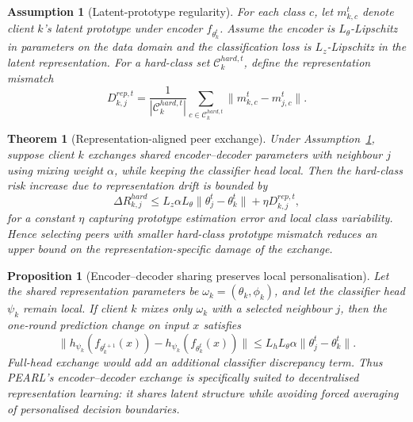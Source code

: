 \documentclass[conference]{IEEEtran}
\newtheorem{assumption}{Assumption}
\newtheorem{proposition}{Proposition}
\newtheorem{theorem}{Theorem}
\begin{document}
\begin{assumption}[Latent-prototype regularity]
\label{ass:latent_prototype_regularity}
For each class \(c\), let \(m_{k,c}^{t}\) denote client \(k\)'s latent prototype under encoder \(f_{\theta_k^t}\). Assume the encoder is \(L_\theta\)-Lipschitz in parameters on the data domain and the classification loss is \(L_z\)-Lipschitz in the latent representation. For a hard-class set \(\mathcal{C}_k^{hard,t}\), define the representation mismatch
\begin{equation*}
D_{k,j}^{rep,t}
=
\frac{1}{|\mathcal{C}_k^{hard,t}|}
\sum_{c\in\mathcal{C}_k^{hard,t}}
\|m_{k,c}^{t}-m_{j,c}^{t}\|.
\end{equation*}
\end{assumption}

\begin{theorem}[Representation-aligned peer exchange]
\label{thm:representation_aligned_exchange}
Under Assumption~\ref{ass:latent_prototype_regularity}, suppose client \(k\) exchanges shared encoder--decoder parameters with neighbour \(j\) using mixing weight \(\alpha\), while keeping the classifier head local. Then the hard-class risk increase due to representation drift is bounded by
\begin{equation*}
\Delta R_{k,j}^{hard}
\leq
L_z\alpha L_\theta\|\theta_j^t-\theta_k^t\|
+\eta D_{k,j}^{rep,t},
\end{equation*}
for a constant \(\eta\) capturing prototype estimation error and local class variability. Hence selecting peers with smaller hard-class prototype mismatch reduces an upper bound on the representation-specific damage of the exchange.
\end{theorem}

\begin{proposition}[Encoder--decoder sharing preserves local personalisation]
\label{prop:encoder_decoder_personalisation}
Let the shared representation parameters be \(\omega_k=(\theta_k,\phi_k)\), and let the classifier head \(\psi_k\) remain local. If client \(k\) mixes only \(\omega_k\) with a selected neighbour \(j\), then the one-round prediction change on input \(x\) satisfies
\begin{equation*}
\|h_{\psi_k}(f_{\theta_k^{t+1}}(x))
-h_{\psi_k}(f_{\theta_k^t}(x))\|
\leq
L_h L_\theta \alpha \|\theta_j^t-\theta_k^t\|.
\end{equation*}
Full-head exchange would add an additional classifier discrepancy term. Thus PEARL's encoder--decoder exchange is specifically suited to decentralised representation learning: it shares latent structure while avoiding forced averaging of personalised decision boundaries.
\end{proposition}
\end{document}
